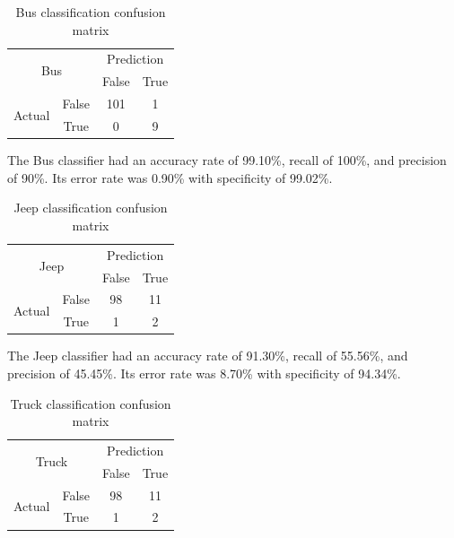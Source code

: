 \documentclass[conference]{IEEEtran}
\begin{document}
\begin{table}[]
\centering
\caption{Bus classification confusion matrix}
\label{cm:bus}
\begin{tabular}{|c|c|c|c|}
\hline
\multicolumn{2}{|c|}{\multirow{2}{*}{Bus}} & \multicolumn{2}{c|}{Prediction}  \\ \cline{3-4} 
\multicolumn{2}{|c|}{}                       & False          & True          \\ \hline
\multirow{2}{*}{Actual}         & False      & 101            & 1             \\ \cline{2-4} 
                                & True       & 0              & 9             \\ \hline
\end{tabular}
\end{table}

The Bus classifier had an accuracy rate of 99.10\%, recall of 100\%, and precision of 90\%. Its error rate was 0.90\% with specificity of 99.02\%. 

\begin{table}[]
\centering
\caption{Jeep classification confusion matrix}
\label{cm:jeep}
\begin{tabular}{|c|c|c|c|}
\hline
\multicolumn{2}{|c|}{\multirow{2}{*}{Jeep}} & \multicolumn{2}{c|}{Prediction} \\ \cline{3-4} 
\multicolumn{2}{|c|}{}                       & False          & True           \\ \hline
\multirow{2}{*}{Actual}         & False      & 98             & 11             \\ \cline{2-4} 
                                & True       &  1             &  2             \\ \hline
\end{tabular}
\end{table}

The Jeep classifier had an accuracy rate of 91.30\%, recall of 55.56\%, and precision of 45.45\%. Its error rate was 8.70\% with specificity of 94.34\%. 

\begin{table}[]
\centering
\caption{Truck classification confusion matrix}
\label{cm:truck}
\begin{tabular}{|c|c|c|c|}
\hline
\multicolumn{2}{|c|}{\multirow{2}{*}{Truck}} & \multicolumn{2}{c|}{Prediction} \\ \cline{3-4} 
\multicolumn{2}{|c|}{}                       & False          & True           \\ \hline
\multirow{2}{*}{Actual}         & False      & 98             & 11             \\ \cline{2-4} 
                                & True       &  1             &  2             \\ \hline
\end{tabular}
\end{table}
\end{document}

